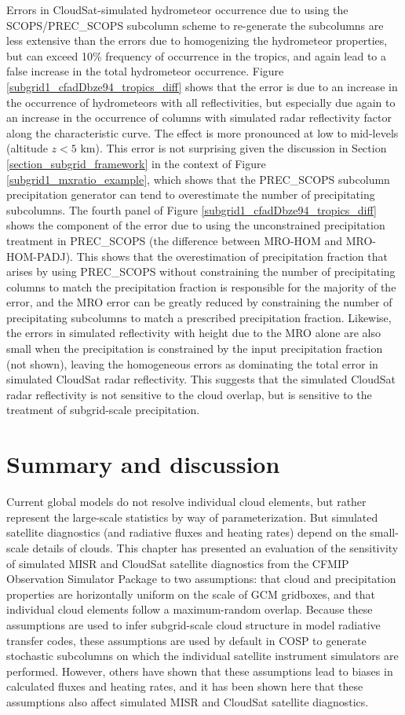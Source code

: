 Errors in CloudSat-simulated hydrometeor occurrence due to using the SCOPS/PREC\_SCOPS subcolumn scheme to re-generate the subcolumns are less extensive than the errors due to homogenizing the hydrometeor properties, but can exceed 10\% frequency of occurrence in the tropics, and again lead to a false increase in the total hydrometeor occurrence. Figure \ref{subgrid1_cfadDbze94_tropics_diff} shows that the error is due to an increase in the occurrence of hydrometeors with all reflectivities, but especially due again to an increase in the occurrence of columns with simulated radar reflectivity factor along the characteristic curve. The effect is more pronounced at low to mid-levels (altitude $z < 5$ km). This error is not surprising given the discussion in Section \ref{section_subgrid_framework} in the context of Figure \ref{subgrid1_mxratio_example}, which shows that the PREC\_SCOPS subcolumn precipitation generator can tend to overestimate the number of precipitating subcolumns. The fourth panel of Figure \ref{subgrid1_cfadDbze94_tropics_diff} shows the component of the error due to using the unconstrained precipitation treatment in PREC\_SCOPS (the difference between MRO-HOM and MRO-HOM-PADJ). This shows that the overestimation of precipitation fraction that arises by using PREC\_SCOPS without constraining the number of precipitating columns to match the precipitation fraction is responsible for the majority of the error, and the MRO error can be greatly reduced by constraining the number of precipitating subcolumns to match a prescribed precipitation fraction. Likewise, the errors in simulated reflectivity with height due to the MRO alone are also small when the precipitation is constrained by the input precipitation fraction (not shown), leaving the homogeneous errors as dominating the total error in simulated CloudSat radar reflectivity. This suggests that the simulated CloudSat radar reflectivity is not sensitive to the cloud overlap, but is sensitive to the treatment of subgrid-scale precipitation.

\section{Summary and discussion} Current global models do not resolve individual cloud elements, but rather represent the large-scale statistics by way of parameterization. But simulated satellite diagnostics (and radiative fluxes and heating rates) depend on the small-scale details of clouds. This chapter has presented an evaluation of the sensitivity of simulated MISR and CloudSat satellite diagnostics from the CFMIP Observation Simulator Package to two assumptions: that cloud and precipitation properties are horizontally uniform on the scale of GCM gridboxes, and that individual cloud elements follow a maximum-random overlap. Because these assumptions are used to infer subgrid-scale cloud structure in model radiative transfer codes, these assumptions are used by default in COSP to generate stochastic subcolumns on which the individual satellite instrument simulators are performed. However, others have shown that these assumptions lead to biases in calculated fluxes and heating rates, and it has been shown here that these assumptions also affect simulated MISR and CloudSat satellite diagnostics.  

